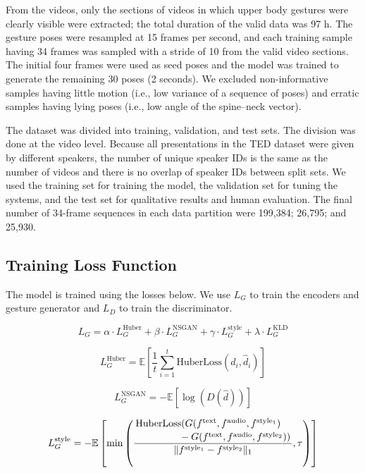 \documentclass[acmtog]{acmart}
\begin{document}
From the videos, only the sections of videos in which upper body gestures were clearly visible were extracted; the total duration of the valid data was 97 h. The gesture poses were resampled at 15 frames per second, and each training sample having 34 frames was sampled with a stride of 10 from the valid video sections. The initial four frames were used as seed poses and the model was trained to generate the remaining 30 poses (2 seconds). We excluded non-informative samples having little motion (i.e., low variance of a sequence of poses) and erratic samples having lying poses (i.e., low angle of the spine--neck vector).

The dataset was divided into training, validation, and test sets. The division was done at the video level. Because all presentations in the TED dataset were given by different speakers, the number of unique speaker IDs is the same as the number of videos and there is no overlap of speaker IDs between split sets. We used the training set for training the model, the validation set for tuning the systems, and the test set for qualitative results and human evaluation. The final number of 34-frame sequences in each data partition were 199,384; 26,795; and 25,930. 

\subsection{Training Loss Function}
The model is trained using the losses below. We use $L_{G}$ to train the encoders and gesture generator and $L_{D}$ to train the discriminator.

\begin{equation}
\label{eqn:loss}
L_{G}=\alpha \cdot L_G^\textrm{Huber}  + \beta \cdot L_G^\textrm{NSGAN} + \gamma \cdot L_G^\textrm{style} + \lambda \cdot L_G^\textrm{KLD}
\end{equation}

\begin{equation}
\label{eqn:loss_l1}
L_G^\textrm{Huber} = \mathbb{E}[{\frac{1}{t}}\sum_{i=1}^{t}\textrm{HuberLoss}(d_{i}, \hat{d}_{i})]
\end{equation}

\begin{equation}
\label{eqn:loss_G}
L_G^\textrm{NSGAN} = -\mathbb{E}[\log(D(\hat{d}))]
\end{equation}

\begin{equation}
\label{eqn:loss_vid_reg}
L_G^\textrm{style} = -\mathbb{E} \left[ \textrm{min} \left( \dfrac{\splitdfrac{
\textrm{HuberLoss}(G(f^\textrm{text}, f^\textrm{audio}, f^\mathrm{style_1})}{\quad-G(f^\textrm{text}, f^\textrm{audio}, f^\mathrm{style_2}))
}}{\lVert f^\mathrm{style_1}-f^\mathrm{style_2} \rVert_1} , \tau \right) \right]
\end{equation}
\end{document}
